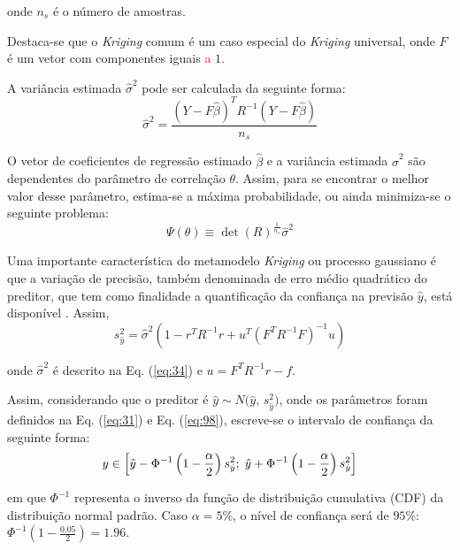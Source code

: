 \noindent onde $n_s$ é o número de amostras.

Destaca-se que o {\it Kriging} comum é um caso especial do {\it Kriging} universal, onde $F$ é um vetor com componentes iguais \textcolor{red}{a} $1$.

A variância estimada $\hat{\sigma}^2$ pode ser calculada da seguinte forma:
\begin{equation}
\hat{\sigma}^2 = \frac{(Y-F\hat{\beta})^TR^{-1}(Y-F\hat{\beta})} {n_s}
\label{eq:34}
\end{equation}

O vetor de coeficientes de regressão estimado $\hat\beta$ e a variância estimada ${\hat\sigma}^2$ são dependentes do parâmetro de correlação $\theta$. Assim, para se encontrar o melhor valor desse parâmetro, estima-se a máxima probabilidade, ou ainda minimiza-se o seguinte problema:
\begin{equation}
 {\Psi(\theta)\equiv {\det(R)}^{\frac{1}{n_s}}{\hat\sigma}^2}
 \label{eq:35}
\end{equation}

Uma importante característica do metamodelo {\it Kriging} ou processo gaussiano é que a variação de precisão, também denominada de erro médio quadrático do preditor, que tem como finalidade a quantificação da confiança na previsão $\hat{y}$, está disponível \cite{viana2010not,lataniotis2017}. Assim,
\begin{equation}
{s}^2_{\hat y} = {\hat\sigma}^2 \left(1-{r}^T{R}^{-1}r+{u}^T\left({F}^T{R}^{-1}F\right)^{-1}u\right)
\label{eq:98}
\end{equation}

\noindent onde ${\hat\sigma}^2$ é descrito na Eq. (\ref{eq:34}) e $u = {F}^T{R}^{-1}r-f$.

Assim, considerando que o preditor é $\hat{y}\sim N ({\hat y}$, ${s}^2_{\hat y})$, onde os parâmetros foram definidos na Eq. (\ref{eq:31}) e Eq. (\ref{eq:98}), escreve-se o intervalo de confiança da seguinte forma:
\begin{equation}
y \in  \left[{\hat y}-\Phi^{-1} \left(1- \frac{{\alpha}}{2}\right){s}^2_{\hat y};\hspace{0.1 cm} {\hat y}+\Phi^{-1}\left(1- \frac{{\alpha}}{2}\right){s}^2_{\hat y}\right] 
\label{eq:99}
\end{equation}

\noindent em que $\Phi^{-1}$ representa o inverso da função de distribuição cumulativa (CDF) da distribuição normal padrão. Caso $\alpha = 5 \% $, o nível de confiança será de $95\%$: $\Phi^{-1} \left(1- \frac{{0.05}}{2}\right) = 1.96$. 

